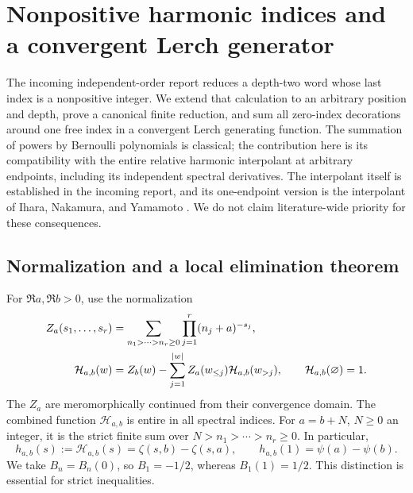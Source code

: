 
\section{Nonpositive harmonic indices and a convergent Lerch generator}
\label{harm:section}

The incoming independent-order report reduces a depth-two word whose
last index is a nonpositive integer. We extend that calculation to an
arbitrary position and depth, prove a canonical finite reduction, and
sum all zero-index decorations around one free index in a convergent
Lerch generating function. The summation of powers by Bernoulli
polynomials is classical; the contribution here is its compatibility
with the entire relative harmonic interpolant at arbitrary endpoints,
including its independent spectral derivatives. The interpolant itself
is established in the incoming report, and its one-endpoint version is
the interpolant of Ihara, Nakamura, and Yamamoto
\cite{harm:INY}. We do not claim literature-wide priority for these
consequences.

\subsection{Normalization and a local elimination theorem}

For $\Re a,\Re b>0$, use the normalization
\begin{align}
 Z_a(s_1,\ldots,s_r)
  &=\sum_{n_1>\cdots>n_r\ge0}
                  \prod_{j=1}^r(n_j+a)^{-s_j},\notag\\
 \mathcal H_{a,b}(w)
  &=Z_b(w)-\sum_{j=1}^{|w|}Z_a(w_{\le j})
                              \mathcal H_{a,b}(w_{>j}),
 \qquad \mathcal H_{a,b}(\varnothing)=1.
 \label{harm:normalization}
\end{align}
The $Z_a$ are meromorphically continued from their convergence domain.
The combined function $\mathcal H_{a,b}$ is entire in all spectral
indices. For $a=b+N$, $N\ge0$ an integer, it is the strict finite sum
over $N>n_1>\cdots>n_r\ge0$. In particular,
\begin{equation}
 h_{a,b}(s):=\mathcal H_{a,b}(s)
      =\zeta(s,b)-\zeta(s,a),\qquad
 h_{a,b}(1)=\psi(a)-\psi(b).
 \label{harm:h}
\end{equation}
We take $B_n=B_n(0)$, so $B_1=-1/2$, whereas $B_1(1)=1/2$.
This distinction is essential for strict inequalities.


